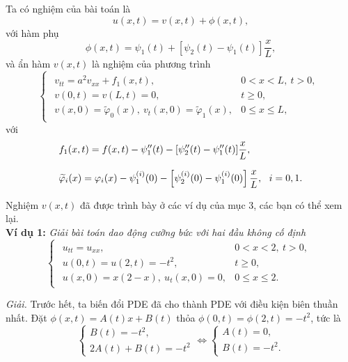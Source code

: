 \documentclass[10pt, a4paper]{article}
\begin{document}
	Ta có nghiệm của bài toán là $$u(x,t)=v(x,t)+\phi(x,t),$$ với hàm phụ $$\phi(x,t)=\psi_1(t)+[\psi_2(t)-\psi_1(t)]\dfrac xL,$$
	và ẩn hàm $v(x,t)$ là nghiệm của phương trình $$\begin{cases}
		\begin{array}{ll}
			v_{tt}=a^2v_{xx}+f_1(x,t), & 0<x<L,~t>0,\\
			v(0,t)=v(L,t)=0, & t\ge0,\\
			v(x,0)=\widetilde\varphi_0(x),~v_t(x,0)=\widetilde\varphi_1(x), & 0\le x\le L,
		\end{array}
	\end{cases}$$ với \begin{align*}
		&f_1(x,t)=f(x,t)-\psi_1''(t)-[\psi_2''(t)-\psi_1''(t)]\dfrac xL,\\
		\noalign{\vskip7pt}
		&\widetilde\varphi_i(x)=\varphi_i(x)-\psi_1^{(i)}(0)-\left[\psi_2^{(i)}(0)-\psi_1^{(i)}(0)\right]\dfrac xL,~~i=0,1.
	\end{align*}
	
	Nghiệm $v(x,t)$ đã được trình bày ở các ví dụ của mục 3, các bạn có thể xem lại.\\
	
	\textbf{Ví dụ 1:} \textit{Giải bài toán dao động cưỡng bức với hai đầu không cố định} $$\begin{cases}
		\begin{array}{ll}
			u_{tt}=u_{xx}, & 0<x<2,~t>0, \\
			u(0,t)=u(2,t)=-t^2, & t\ge0, \\
			u(x,0)=x(2-x),~u_t(x,0)=0, & 0\le x\le2.
		\end{array}
	\end{cases}$$
	
	\textit{Giải.} Trước hết, ta biến đổi PDE đã cho thành PDE với điều kiện biên thuần nhất. Đặt $\phi(x,t)=A(t)x+B(t)$ thỏa $\phi(0,t)=\phi(2,t)=-t^2$, tức là $$\begin{cases}
		B(t)=-t^2,\\
		2A(t)+B(t)=-t^2
	\end{cases}\iff\begin{cases}
		A(t)=0,\\
		B(t)=-t^2.
	\end{cases}$$
	
\end{document}
